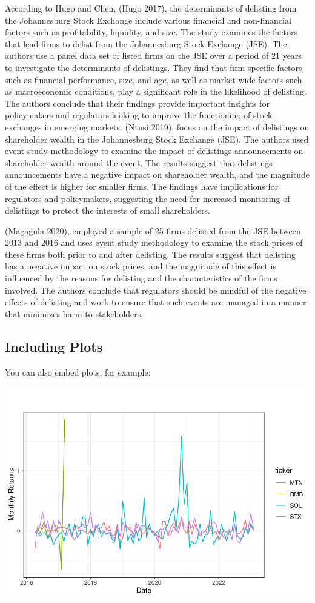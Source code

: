 \documentclass[
]{article}
\begin{document}
According to Hugo and Chen, (Hugo 2017), the determinants of delisting
from the Johannesburg Stock Exchange include various financial and
non-financial factors such as profitability, liquidity, and size. The
study examines the factors that lead firms to delist from the
Johannesburg Stock Exchange (JSE). The authors use a panel data set of
listed firms on the JSE over a period of 21 years to investigate the
determinants of delistings. They find that firm-specific factors such as
financial performance, size, and age, as well as market-wide factors
such as macroeconomic conditions, play a significant role in the
likelihood of delisting. The authors conclude that their findings
provide important insights for policymakers and regulators looking to
improve the functioning of stock exchanges in emerging markets. (Ntusi
2019), focus on the impact of delistings on shareholder wealth in the
Johannesburg Stock Exchange (JSE). The authors used event study
methodology to examine the impact of delistings announcements on
shareholder wealth around the event. The results suggest that delistings
announcements have a negative impact on shareholder wealth, and the
magnitude of the effect is higher for smaller firms. The findings have
implications for regulators and policymakers, suggesting the need for
increased monitoring of delistings to protect the interests of small
shareholders.

(Magagula 2020), employed a sample of 25 firms delisted from the JSE
between 2013 and 2016 and uses event study methodology to examine the
stock prices of these firms both prior to and after delisting. The
results suggest that delisting has a negative impact on stock prices,
and the magnitude of this effect is influenced by the reasons for
delisting and the characteristics of the firms involved. The authors
conclude that regulators should be mindful of the negative effects of
delisting and work to ensure that such events are managed in a manner
that minimizes harm to stakeholders.

\hypertarget{including-plots}{%
\subsection{Including Plots}\label{including-plots}}

You can also embed plots, for example:

\includegraphics{JSE_Stocks_files/figure-latex/returns_plot-1.pdf}
\end{document}
